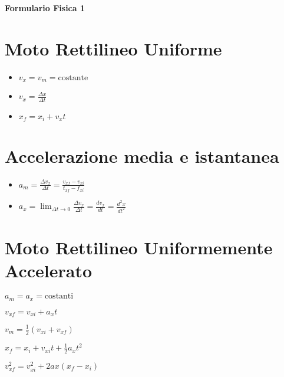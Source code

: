 \documentclass[a4paper,12pt,landscape]{article}
\title{}
\author{}
\date{}
\begin{document}
\begin{center}
    \vspace{1cm}
    \textbf{\Large Formulario Fisica 1}
    \vspace{1cm}
\end{center}

\begin{multicols*}{2}
    \section*{Moto Rettilineo Uniforme}
    \begin{itemize}
        \item $v_x = v_m = \text{costante}$
        \item $v_x = \frac{\Delta x}{\Delta t}$
        \item $x_f = x_i + v_x t$
    \end{itemize}

    \section*{Accelerazione media e istantanea}
    \begin{itemize}
        \item $a_m = \frac{\Delta v_x}{\Delta t} = \frac{v_{xf} - v_{xi}}{t_{xf} - f_{xi}}$
        \item $a_x = \displaystyle\lim_{\Delta t \to 0} \frac{\Delta v_x}{\Delta t} = \frac{dv_x}{dt} = \frac{d^2 x}{dt^2}$
    \end{itemize}

    \section*{Moto Rettilineo Uniformemente Accelerato}
    \begin{itemize}
        \begin{multicols*}{2}
            \item $a_m = a_x = \text{costanti}$
            \item $v_{xf} = v_{xi} + a_x t$
            \item $v_m = \tfrac{1}{2} (v_{xi} + v_{xf})$
            \item $x_f = x_i + v_{xi}t + \tfrac{1}{2} a_x t^2$
            \item $v^2_{xf} = v^2_{xi} + 2ax(x_f - x_i)$
        \end{multicols*}
    \end{itemize}


\end{multicols*}
\end{document}
